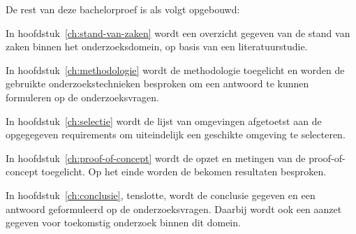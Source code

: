 
De rest van deze bachelorproef is als volgt opgebouwd:

In hoofdstuk~\ref{ch:stand-van-zaken} wordt een overzicht gegeven van de stand van zaken binnen het onderzoeksdomein,
 op basis van een literatuurstudie.

In hoofdstuk~\ref{ch:methodologie} wordt de methodologie toegelicht en worden de gebruikte onderzoekstechnieken besproken om een antwoord te kunnen formuleren 
op de onderzoeksvragen.

In hoofdstuk~\ref{ch:selectie} wordt de lijst van omgevingen afgetoetst aan de opgegegeven requirements om uiteindelijk een geschikte omgeving te selecteren.

In hoofdstuk~\ref{ch:proof-of-concept} wordt de opzet en metingen van de proof-of-concept toegelicht. Op het einde worden de bekomen resultaten besproken.

In hoofdstuk~\ref{ch:conclusie}, tenslotte, 
wordt de conclusie gegeven en een antwoord geformuleerd op de onderzoeksvragen. 
Daarbij wordt ook een aanzet gegeven voor toekomstig onderzoek binnen dit domein.